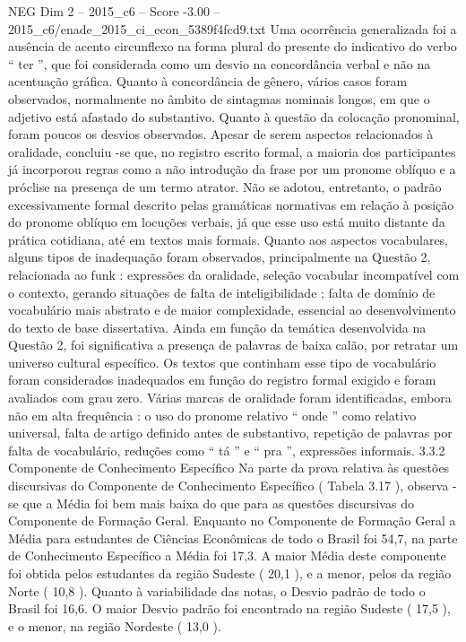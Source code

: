 \begin{textsample}{NEG Dim 2 – 2015\_c6 – Score -3.00 – 2015\_c6/enade\_2015\_ci\_econ\_5389f4fcd9.txt}
Uma ocorrência generalizada foi a ausência de acento circunflexo na forma plural do presente do indicativo do verbo “ ter ”, que foi considerada como um desvio na concordância verbal e não na acentuação gráfica.
Quanto à concordância de gênero, vários casos foram observados, normalmente no âmbito de sintagmas nominais longos, em que o adjetivo está afastado do substantivo.
Quanto à questão da colocação pronominal, foram poucos os desvios observados.
Apesar de serem aspectos relacionados à oralidade, concluiu -se que, no registro escrito formal, a maioria dos participantes já incorporou regras como a não introdução da frase por um pronome oblíquo e a próclise na presença de um termo atrator.
Não se adotou, entretanto, o padrão excessivamente formal descrito pelas gramáticas normativas em relação à posição do pronome oblíquo em locuções verbais, já que esse uso está muito distante da prática cotidiana, até em textos mais formais.
Quanto aos aspectos vocabulares, alguns tipos de inadequação foram observados, principalmente na Questão 2, relacionada ao funk : expressões da oralidade, seleção vocabular incompatível com o contexto, gerando situações de falta de inteligibilidade ; falta de domínio de vocabulário mais abstrato e de maior complexidade, essencial ao desenvolvimento do texto de base dissertativa.
Ainda em função da temática desenvolvida na Questão 2, foi significativa a presença de palavras de baixa calão, por retratar um universo cultural específico.
Os textos que continham esse tipo de vocabulário foram considerados inadequados em função do registro formal exigido e foram avaliados com grau zero.
Várias marcas de oralidade foram identificadas, embora não em alta frequência : o uso do pronome relativo “ onde ” como relativo universal, falta de artigo definido antes de substantivo, repetição de palavras por falta de vocabulário, reduções como “ tá ” e “ pra ”, expressões informais. 3.3.2 Componente de Conhecimento Específico Na parte da prova relativa às questões discursivas do Componente de Conhecimento Específico ( Tabela 3.17 ), observa -se que a Média foi bem mais baixa do que para as questões discursivas do Componente de Formação Geral.
Enquanto no Componente de Formação Geral a Média para estudantes de Ciências Econômicas de todo o Brasil foi 54,7, na parte de Conhecimento Específico a Média foi 17,3.
A maior Média deste componente foi obtida pelos estudantes da região Sudeste ( 20,1 ), e a menor, pelos da região Norte ( 10,8 ).
Quanto à variabilidade das notas, o Desvio padrão de todo o Brasil foi 16,6.
O maior Desvio padrão foi encontrado na região Sudeste ( 17,5 ), e o menor, na região Nordeste ( 13,0 ).

\end{textsample}
